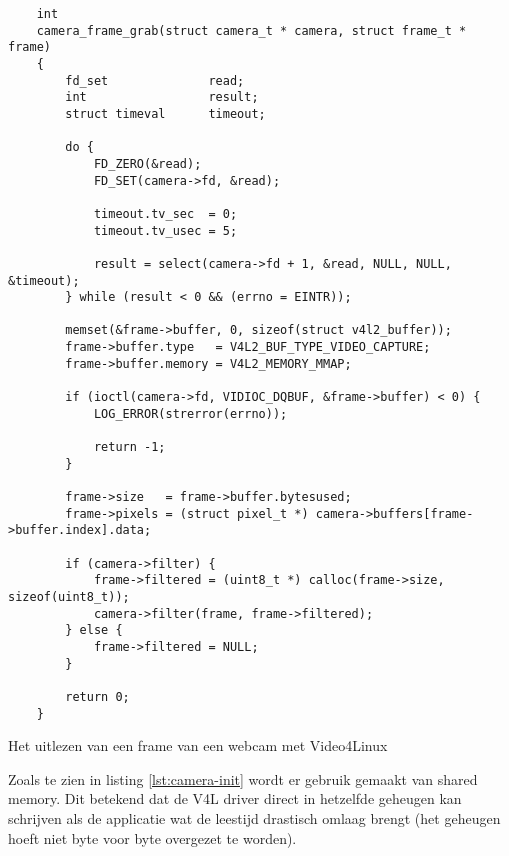 \begin{listing}
    \begin{verbatim}
    int
    camera_frame_grab(struct camera_t * camera, struct frame_t * frame)
    {
        fd_set              read;
        int                 result;
        struct timeval      timeout;

        do {
            FD_ZERO(&read);
            FD_SET(camera->fd, &read);

            timeout.tv_sec  = 0;
            timeout.tv_usec = 5;

            result = select(camera->fd + 1, &read, NULL, NULL, &timeout);
        } while (result < 0 && (errno = EINTR));

        memset(&frame->buffer, 0, sizeof(struct v4l2_buffer));
        frame->buffer.type   = V4L2_BUF_TYPE_VIDEO_CAPTURE;
        frame->buffer.memory = V4L2_MEMORY_MMAP;

        if (ioctl(camera->fd, VIDIOC_DQBUF, &frame->buffer) < 0) {
            LOG_ERROR(strerror(errno));

            return -1;
        }

        frame->size   = frame->buffer.bytesused;
        frame->pixels = (struct pixel_t *) camera->buffers[frame->buffer.index].data;

        if (camera->filter) {
            frame->filtered = (uint8_t *) calloc(frame->size, sizeof(uint8_t));
            camera->filter(frame, frame->filtered);
        } else {
            frame->filtered = NULL;
        }

        return 0;
    }
    \end{verbatim}
    \caption{Het uitlezen van een frame van een webcam met Video4Linux}
    \label{lst:camera-read}
\end{listing}

Zoals te zien in listing \ref{lst:camera-init} wordt er gebruik gemaakt van
shared memory. Dit betekend dat de V4L driver direct in hetzelfde geheugen kan
schrijven als de \autonerf applicatie wat de leestijd drastisch omlaag brengt
(het geheugen hoeft niet byte voor byte overgezet te worden).
